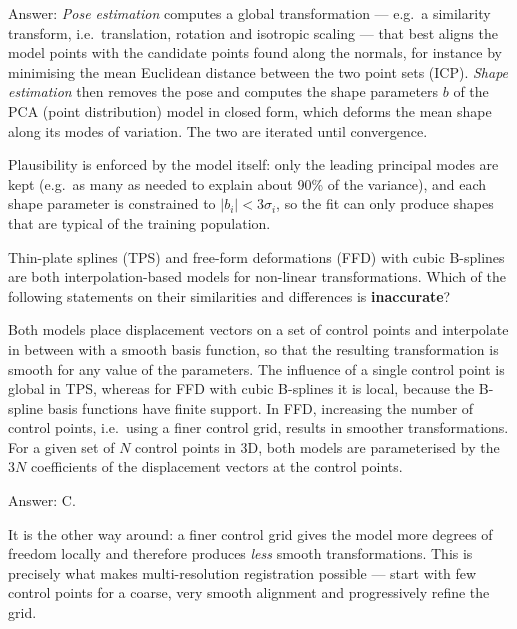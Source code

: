 \documentclass[11pt]{exam}
\newcommand{\answerspace}[1]{\ifprintanswers\else\vspace{#1}\fi}
\begin{document}
\begin{questions}
\begin{solution}
  Answer: \emph{Pose estimation} computes a global transformation --- e.g.\ a similarity
  transform, i.e.\ translation, rotation and isotropic scaling --- that best aligns the model
  points with the candidate points found along the normals, for instance by minimising the mean
  Euclidean distance between the two point sets (ICP). \emph{Shape estimation} then removes the
  pose and computes the shape parameters $b$ of the PCA (point distribution) model in closed
  form, which deforms the mean shape along its modes of variation. The two are iterated until
  convergence.

  Plausibility is enforced by the model itself: only the leading principal modes are kept (e.g.\
  as many as needed to explain about 90\% of the variance), and each shape parameter is
  constrained to $|b_i| < 3\sigma_i$, so the fit can only produce shapes that are typical of the
  training population.
\end{solution}
\answerspace{7.5cm}

\question
Thin-plate splines (TPS) and free-form deformations (FFD) with cubic B-splines are both
interpolation-based models for non-linear transformations. Which of the following statements on
their similarities and differences is \textbf{inaccurate}?

\begin{choices}
  \choice Both models place displacement vectors on a set of control points and interpolate in
  between with a smooth basis function, so that the resulting transformation is smooth for any
  value of the parameters.
  \choice The influence of a single control point is global in TPS, whereas for FFD with cubic
  B-splines it is local, because the B-spline basis functions have finite support.
  \choice In FFD, increasing the number of control points, i.e.\ using a finer control grid,
  results in smoother transformations.
  \choice For a given set of $N$ control points in 3D, both models are parameterised by the
  $3N$ coefficients of the displacement vectors at the control points.
\end{choices}

\begin{solution}
  Answer: C.

  It is the other way around: a finer control grid gives the model more degrees of freedom
  locally and therefore produces \emph{less} smooth transformations. This is precisely what makes
  multi-resolution registration possible --- start with few control points for a coarse, very
  smooth alignment and progressively refine the grid.
\end{solution}


\end{questions}
\end{document}
